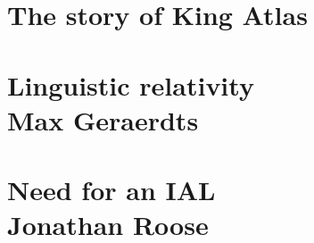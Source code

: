 


\section{The story of King Atlas}




\section{Linguistic relativity \\ {\small Max Geraerdts}}


\section{Need for an IAL \\ {\small Jonathan Roose}}

